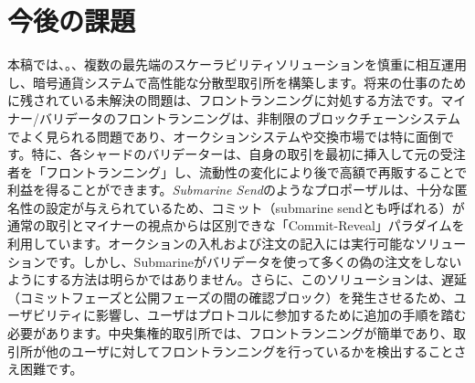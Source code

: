 \section{今後の課題}
本稿では、。、複数の最先端のスケーラビリティソリューションを慎重に相互運用し、暗号通貨システムで高性能な分散型取引所を構築します。将来の仕事のために残されている未解決の問題は、フロントランニングに対処する方法です。マイナー/バリデータのフロントランニングは、非制限のブロックチェーンシステムでよく見られる問題であり、オークションシステムや交換市場では特に面倒です。特に、各シャードのバリデーターは、自身の取引を最初に挿入して元の受注者を「フロントランニング」し、流動性の変化により後で高額で再販することで利益を得ることができます。\textit{Submarine Send}\cite{submarine}のようなプロポーザルは、十分な匿名性の設定が与えられているため、コミット（submarine sendとも呼ばれる）が通常の取引とマイナーの視点からは区別できな「Commit-Reveal」パラダイムを利用しています。オークションの入札および注文の記入には実行可能なソリューションです。しかし、Submarineがバリデータを使って多くの偽の注文をしないようにする方法は明らかではありません。さらに、このソリューションは、遅延（コミットフェーズと公開フェーズの間の確認ブロック）を発生させるため、ユーザビリティに影響し、ユーザはプロトコルに参加するために追加の手順を踏む必要があります。中央集権的取引所では、フロントランニングが簡単であり、取引所が他のユーザに対してフロントランニングを行っているかを検出することさえ困難です。
